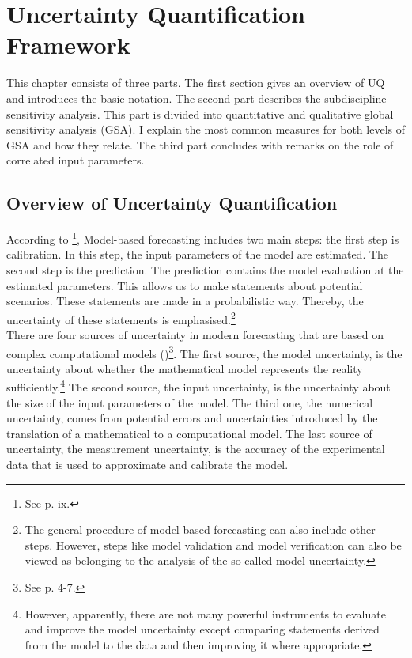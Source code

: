 \section{Uncertainty Quantification Framework}
\thispagestyle{plain} %

This chapter consists of three parts. The first section gives an overview of UQ and introduces the basic notation. The second part describes the subdiscipline sensitivity analysis. This part is divided into quantitative and qualitative global sensitivity analysis (GSA). I explain the most common measures for both levels of GSA and how they relate. The third part concludes with remarks on the role of correlated input parameters.

\subsection{Overview of Uncertainty Quantification}
According to \cite{Smith.2014}\footnote{See p. ix.}, Model-based forecasting includes two main steps: the first step is calibration. In this step, the input parameters of the model are estimated. The second step is the prediction. The prediction contains the model evaluation at the estimated parameters. This allows us to make statements about potential scenarios. These statements are made in a probabilistic way. Thereby, the uncertainty of these statements is emphasised.\footnote{The general procedure of model-based forecasting can also include other steps. However, steps like model validation and model verification can also be viewed as belonging to the analysis of the so-called model uncertainty.}\\
\newline
There are four sources of uncertainty in modern forecasting that are based on complex computational models (\cite{Smith.2014})\footnote{See p. 4-7.}. The first source, the model uncertainty, is the uncertainty about whether the mathematical model represents the reality sufficiently.\footnote{However, apparently, there are not many powerful instruments to evaluate and improve the model uncertainty except comparing statements derived from the model to the data and then improving it where appropriate.} The second source, the input uncertainty, is the uncertainty about the size of the input parameters of the model. The third one, the numerical uncertainty, comes from potential errors and uncertainties introduced by the translation of a mathematical to a computational model. The last source of uncertainty, the measurement uncertainty, is the accuracy of the experimental data that is used to approximate and calibrate the model.

